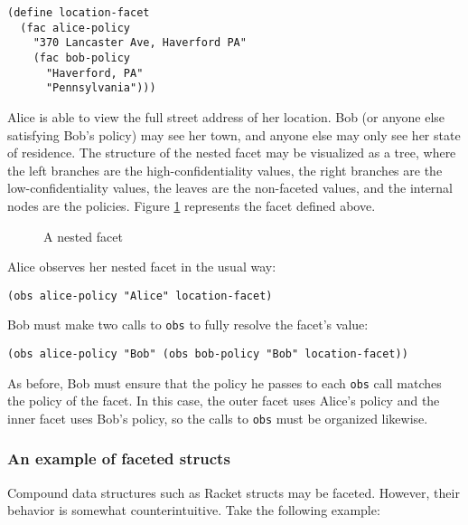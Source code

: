 \documentclass{article}
\begin{document}
\begin{lstlisting}
(define location-facet
  (fac alice-policy
    "370 Lancaster Ave, Haverford PA"
    (fac bob-policy
      "Haverford, PA"
      "Pennsylvania")))
\end{lstlisting}

Alice is able to view the full street address of her location. Bob (or anyone else satisfying Bob's policy) may see her town, and anyone else may only see her state of residence. The structure of the nested facet may be visualized as a tree, where the left branches are the high-confidentiality values, the right branches are the low-confidentiality values, the leaves are the non-faceted values, and the internal nodes are the policies. Figure \ref{figure:nested} represents the facet defined above.

\begin{figure}[h]
\begin{center}
	\caption{A nested facet}
	\label{figure:nested}
\end{center}
\end{figure}

Alice observes her nested facet in the usual way:

\begin{lstlisting}
(obs alice-policy "Alice" location-facet)
\end{lstlisting}

Bob must make two calls to \texttt{obs} to fully resolve the facet's value:

\begin{lstlisting}
(obs alice-policy "Bob" (obs bob-policy "Bob" location-facet))
\end{lstlisting}

As before, Bob must ensure that the policy he passes to each \texttt{obs} call matches the policy of the facet. In this case, the outer facet uses Alice's policy and the inner facet uses Bob's policy, so the calls to \texttt{obs} must be organized likewise.


\subsubsection{An example of faceted structs}
Compound data structures such as Racket structs may be faceted. However, their behavior is somewhat counterintuitive. Take the following example:
\end{document}
